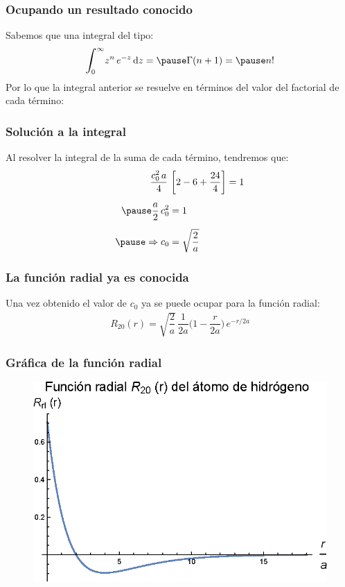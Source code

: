 \documentclass[12pt]{beamer}
\begin{document}
\begin{frame}
\frametitle{Ocupando un resultado conocido}
Sabemos que una integral del tipo:
\pause
\begin{eqnarray*}
\scaleint{6ex}_{\bs 0}^{\infty} z^{n} \, e^{-z} \dd{z} = \pause \Gamma(n + 1) = \pause n!
\end{eqnarray*}
\pause
Por lo que la integral anterior se resuelve en términos del valor del factorial de cada término:
\end{frame}
\begin{frame}
\frametitle{Solución a la integral}
Al resolver la integral de la suma de cada término, tendremos que:
\pause
\begin{equation*}
\begin{aligned}
\dfrac{c_{0}^{2} \, a}{4} \, &\left[ 2 - 6 + \dfrac{24}{4} \right] = 1 \\[0.5em] \pause
\dfrac{a}{2} \, c_{0}^{2} &= 1 \\[0.5em] \pause
\Rightarrow c_{0} &= \sqrt{\dfrac{2}{a}}
\end{aligned}
\end{equation*}
\end{frame}
\begin{frame}
\frametitle{La función radial ya es conocida}
Una vez obtenido el valor de $c_{0}$ ya se puede ocupar para la función radial:
\pause
\begin{align*}
R_{20} (r) = \sqrt{\dfrac{2}{a}} \, \dfrac{1}{2 a} \bigg( 1 - \dfrac{r}{2 a} \bigg) \, e^{-r/2a}
\end{align*}
\end{frame}
\begin{frame}
\frametitle{Gráfica de la función radial}
\begin{figure}
   \centering
   \includegraphics[scale=1]{Imagenes/Plot_Hermite_Radial_20.eps}
\end{figure}
\end{frame}
\end{document}
